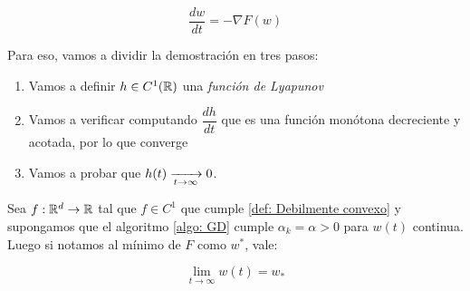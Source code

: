 \begin{equation}
\label{eq: Ecuacion diferencial de descenso de gradiente}
\dfrac{d w}{dt} = - \nabla F(w)
\end{equation}

Para eso, vamos a dividir la demostraci\'on en tres pasos:

\begin{enumerate}
	\item Vamos a definir $h \in C^1({\mathbb{R}})$ una \textit{funci\'on de Lyapunov}
	\item Vamos a verificar computando $\dfrac{dh}{dt}$ que es una funci\'on mon\'otona decreciente y acotada, por lo que converge
	\item Vamos a probar que $h(t) \xrightarrow[t \rightarrow \infty]{} 0$.
\end{enumerate}

\begin{proposition}
	\label{Objetivo debilmente convexo, GD continue converge}
	Sea $f:{\mathbb{R}}^d \rightarrow {\mathbb{R}}$ tal que $f \in C^1$ que cumple \ref{def: Debilmente convexo} y supongamos que el algoritmo \ref{algo: GD} cumple $\alpha_k=\alpha>0$ para $w(t)$ continua. Luego si notamos al m\'inimo de $F$ como $w^*$, vale:
	
	\begin{equation*}
		\lim\limits_{t \rightarrow \infty} w(t) =  w_*
	\end{equation*}

\end{proposition}

